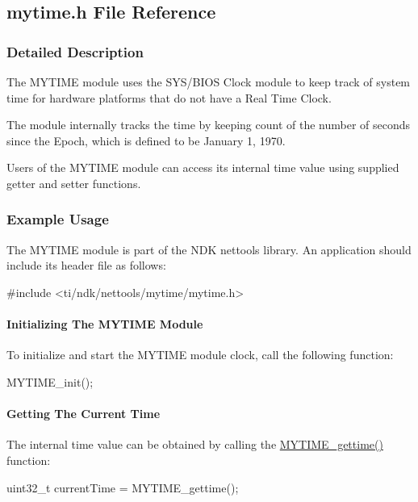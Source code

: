 \subsection{mytime.\+h File Reference}
\label{mytime_8h}


\subsubsection{Detailed Description}
The M\+Y\+T\+I\+M\+E module uses the S\+Y\+S/\+B\+I\+O\+S Clock module to keep track of system time for hardware platforms that do not have a Real Time Clock.

The module internally tracks the time by keeping count of the number of seconds since the Epoch, which is defined to be January 1, 1970.

Users of the M\+Y\+T\+I\+M\+E module can access its internal time value using supplied getter and setter functions.

\subsubsection*{Example Usage}

The M\+Y\+T\+I\+M\+E module is part of the N\+D\+K nettools library. An application should include its header file as follows\+: 
\begin{DoxyCode}
\textcolor{preprocessor}{#include <ti/ndk/nettools/mytime/mytime.h>}
\end{DoxyCode}


\paragraph*{Initializing The M\+Y\+T\+I\+M\+E Module}

To initialize and start the M\+Y\+T\+I\+M\+E module clock, call the following function\+: 
\begin{DoxyCode}
MYTIME_init();
\end{DoxyCode}


\paragraph*{Getting The Current Time}

The internal time value can be obtained by calling the \hyperlink{mytime_8h_a05f7406d31d93f6dc9b7ecaac8a37376}{M\+Y\+T\+I\+M\+E\+\_\+gettime()} function\+: 
\begin{DoxyCode}
uint32\_t currentTime = MYTIME_gettime();
\end{DoxyCode}


